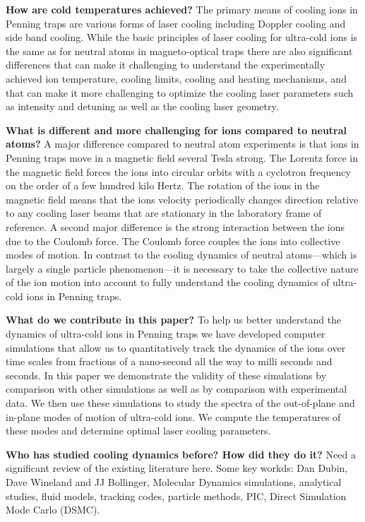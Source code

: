 \documentclass[aps, pra, preprint]{revtex4-1}
\begin{document}
{\bf How are cold temperatures achieved?} The primary means of
cooling ions in Penning traps are various forms of laser cooling
including Doppler cooling and side band cooling. While the basic
principles of laser cooling for ultra-cold ions is the same as
for neutral atoms in magneto-optical traps there are also
significant differences that can make it challenging to
understand the experimentally achieved ion temperature, cooling
limits, cooling and heating mechanisms, and that can make it more
challenging to optimize the cooling laser parameters such as
intensity and detuning as well as the cooling laser geometry.

{\bf What is different and more challenging for ions compared to
neutral atoms?} A major difference compared to neutral atom
experiments is that ions in Penning traps move in a magnetic
field several Tesla strong. The Lorentz force in the magnetic
field forces the ions into circular orbits with a cyclotron
frequency on the order of a few hundred kilo Hertz. The rotation
of the ions in the magnetic field means that the ions velocity
periodically changes direction relative to any cooling laser
beams that are stationary in the laboratory frame of reference. A
second major difference is the strong interaction between the
ions due to the Coulomb force. The Coulomb force couples the ions
into collective modes of motion. In contrast to the cooling
dynamics of neutral atoms---which is largely a single particle
phenomenon---it is necessary to take the collective nature of the
ion motion into account to fully understand the cooling dynamics
of ultra-cold ions in Penning traps.

{\bf What do we contribute in this paper?} To help us better
understand the dynamics of ultra-cold ions in Penning traps we
have developed computer simulations that allow us to
quantitatively track the dynamics of the ions over time scales
from fractions of a nano-second all the way to milli seconds and
seconds. In this paper we demonstrate the validity of these
simulations by comparison with other simulations as well as by
comparison with experimental data. We then use these simulations
to study the spectra of the out-of-plane and in-plane modes of
motion of ultra-cold ions. We compute the temperatures of these
modes and determine optimal laser cooling parameters.

{\bf Who has studied cooling dynamics before? How did they do
it?} Need a significant review of the existing literature here.
Some key workds: Dan Dubin, Dave Wineland and JJ Bollinger,
Molecular Dynamics simulations, analytical studies, fluid models,
tracking codes, particle methods, PIC, Direct Simulation Mode
Carlo (DSMC).
\end{document}
